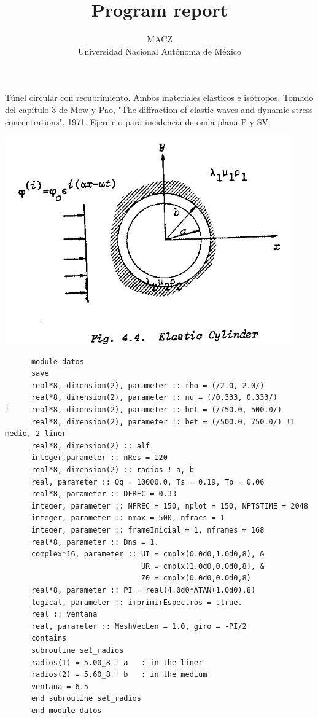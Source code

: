 \documentclass [11pt,spanish]{article}
\begin{document}
\title {Program report}
\author {MACZ\\
Universidad Nacional Aut\'onoma de M\'exico}
\maketitle 

\graphicspath{{./fig/}}

Túnel circular con recubrimiento. Ambos materiales elásticos e isótropos. Tomado del capítulo 3 de Mow y Pao, "The diffraction of elastic waves and dynamic stress concentrations", 1971. 
Ejercicio para incidencia de onda plana P y SV.

\includegraphics[scale=0.5]{figura}
\begingroup
\fontsize{10pt}{12pt}
\selectfont
{}
\begin{shaded}
\begin{verbatim}
      module datos
      save
      real*8, dimension(2), parameter :: rho = (/2.0, 2.0/)
      real*8, dimension(2), parameter :: nu = (/0.333, 0.333/)
!     real*8, dimension(2), parameter :: bet = (/750.0, 500.0/)
      real*8, dimension(2), parameter :: bet = (/500.0, 750.0/) !1 medio, 2 liner
      real*8, dimension(2) :: alf
      integer,parameter :: nRes = 120
      real*8, dimension(2) :: radios ! a, b 
      real, parameter :: Qq = 10000.0, Ts = 0.19, Tp = 0.06
      real*8, parameter :: DFREC = 0.33
      integer, parameter :: NFREC = 150, nplot = 150, NPTSTIME = 2048
      integer, parameter :: nmax = 500, nfracs = 1
      integer, parameter :: frameInicial = 1, nframes = 168
      real*8, parameter :: Dns = 1.
      complex*16, parameter :: UI = cmplx(0.0d0,1.0d0,8), &
                               UR = cmplx(1.0d0,0.0d0,8), &
                               Z0 = cmplx(0.0d0,0.0d0,8)
      real*8, parameter :: PI = real(4.0d0*ATAN(1.0d0),8)
      logical, parameter :: imprimirEspectros = .true.
      real :: ventana
      real, parameter :: MeshVecLen = 1.0, giro = -PI/2
      contains
      subroutine set_radios
      radios(1) = 5.00_8 ! a   : in the liner
      radios(2) = 5.60_8 ! b   : in the medium
      ventana = 6.5
      end subroutine set_radios
      end module datos
\end{verbatim}
\end{shaded}
\endgroup
\end{document}
